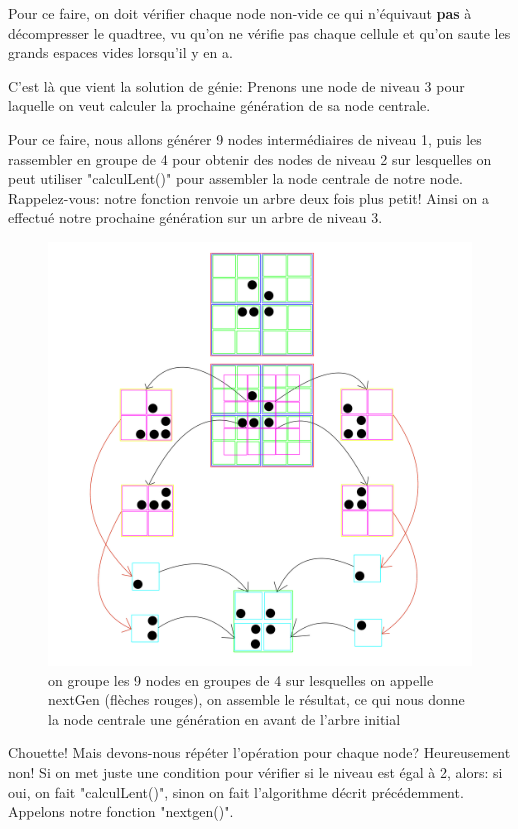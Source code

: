 Pour ce faire, on doit vérifier chaque node non-vide ce qui n'équivaut \textbf{pas} à décompresser le quadtree, vu qu'on ne vérifie pas chaque cellule et qu'on saute les grands espaces vides lorsqu'il y en a.

C'est là que vient la solution de génie: Prenons une node de niveau 3 pour laquelle on veut calculer la prochaine génération de sa node centrale.

Pour ce faire, nous allons générer 9 nodes intermédiaires de niveau 1, puis les rassembler en groupe de 4 pour obtenir des nodes de niveau 2 sur lesquelles on peut utiliser "calculLent()" pour assembler la node centrale de notre node. Rappelez-vous: notre fonction renvoie un arbre deux fois plus petit! Ainsi on a effectué notre prochaine génération sur un arbre de niveau 3. 

\begin{figure}[htp]
        \center
        \includegraphics[scale=0.225]{images/imgHashlife/nextGen.png}
        \caption{on groupe les 9 nodes en groupes de 4 sur lesquelles on appelle nextGen (flèches rouges), on assemble le résultat, ce qui nous donne la node centrale une génération en avant de l'arbre initial}
\end{figure}

Chouette! Mais devons-nous répéter l'opération pour chaque node? Heureusement non! Si on met juste une condition pour vérifier si le niveau est égal à 2, alors: si oui, on fait "calculLent()", sinon on fait l'algorithme décrit précédemment. Appelons notre fonction "nextgen()".

